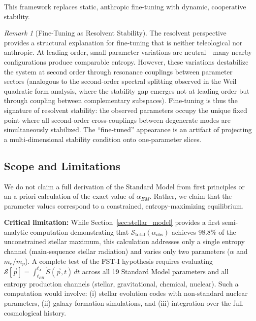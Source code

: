 \documentclass[12pt,a4paper]{article}
\theoremstyle{remark}
\newtheorem{remark}{Remark}
\begin{document}
This framework replaces static, anthropic fine-tuning with dynamic, cooperative stability.

\begin{remark}[Fine-Tuning as Resolvent Stability]
\label{rem:fine-tuning-resolvent}
The resolvent perspective \citep{GeigerRH2026b} provides a structural explanation for fine-tuning that is neither teleological nor anthropic. At leading order, small parameter variations are neutral---many nearby configurations produce comparable entropy. However, these variations destabilize the system at second order through resonance couplings between parameter sectors (analogous to the second-order spectral splitting observed in the Weil quadratic form analysis, where the stability gap emerges not at leading order but through coupling between complementary subspaces). Fine-tuning is thus the signature of resolvent stability: the observed parameters occupy the unique fixed point where all second-order cross-couplings between degenerate modes are simultaneously stabilized. The ``fine-tuned'' appearance is an artifact of projecting a multi-dimensional stability condition onto one-parameter slices.
\end{remark}

\subsection{Scope and Limitations}

We do not claim a full derivation of the Standard Model from first principles or an a priori calculation of the exact value of $\alpha_{EM}$. Rather, we claim that the parameter values correspond to a constrained, entropy-maximizing equilibrium.

\textbf{Critical limitation:} While Section~\ref{sec:stellar_model} provides a first semi-analytic computation demonstrating that $\mathcal{S}_{\text{total}}(\alpha_{\text{obs}})$ achieves 98.8\% of the unconstrained stellar maximum, this calculation addresses only a single entropy channel (main-sequence stellar radiation) and varies only two parameters ($\alpha$ and $m_e/m_p$). A complete test of the FST-I hypothesis requires evaluating $\mathcal{S}[\vec{p}] = \int_{t_{BB}}^{t_\Lambda} \dot{S}(\vec{p}, t)\,dt$ across all 19 Standard Model parameters and all entropy production channels (stellar, gravitational, chemical, nuclear). Such a computation would involve: (i) stellar evolution codes with non-standard nuclear parameters, (ii) galaxy formation simulations, and (iii) integration over the full cosmological history.
\end{document}
